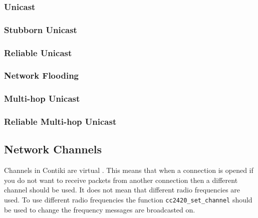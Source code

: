 \subsubsection{Unicast}

\subsubsection{Stubborn Unicast}

\subsubsection{Reliable Unicast}

\subsubsection{Network Flooding}

\subsubsection{Multi-hop Unicast}

\subsubsection{Reliable Multi-hop Unicast}



\subsection{Network Channels}

Channels in Contiki are virtual \cite{tel-aviv-contiki-exercises}. This means that when a connection is opened if you do not want to receive packets from another connection then a different channel should be used. It does not mean that different radio frequencies are used. To use different radio frequencies the function \verb|cc2420_set_channel| should be used to change the frequency messages are broadcasted on.
